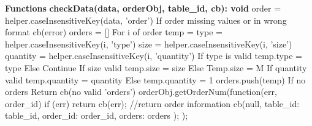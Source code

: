 \documentclass [10pt]{article}
\begin{document}
\textbf{Functions}
\textbf{checkData(data, orderObj, table\_id, cb): void} \newline
order = helper.caseInsensitiveKey(data, 'order') \newline
If order missing values or in wrong format  \newline
	cb(error) \newline
\newline
orders = [] \newline
\newline
For i of order \newline
	temp = {} \newline
	type = helper.caseInsensitiveKey(i, 'type') \newline
	size = helper.caseInsensitiveKey(i, 'size') \newline
	quantity =  helper.caseInsensitiveKey(i, 'quantity') \newline
	If type is valid \newline
		temp.type = type \newline
	Else \newline
		Continue \newline
	 \newline
	If size valid \newline
		temp.size = size \newline
	Else \newline
		Temp.size = M \newline
	If quantity valid \newline
		temp.quantity  = quantity \newline
	Else \newline
		temp.quantity  = 1 \newline
	\newline
	orders.push(temp) \newline
\newline
If no orders \newline
	Return cb(no valid 'orders') \newline
\newline
orderObj.getOrderNum(function(err, order\_id) { \newline
	if (err) { \newline
		return cb(err); \newline
	} \newline
	//return order information \newline
	cb(null, { \newline
		table\_id: table\_id, \newline
		order\_id: order\_id, \newline
		orders: orders \newline
	}); \newline
}); \newline
\end{document}
